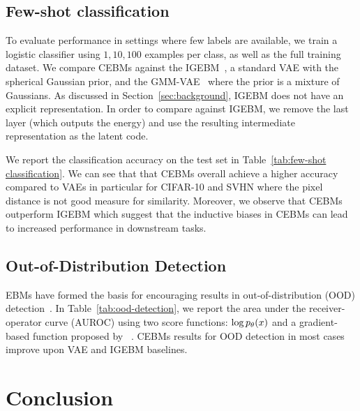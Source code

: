 \documentclass[tablecaption=bottom,wcp]{jmlr} %
\begin{document}
\vspace*{-1.0ex}
\subsection{Few-shot classification}\label{sec:exp:fewshots}
\vspace*{-1.0ex}

To evaluate performance in settings where few labels are available, we train a logistic classifier using $1, 10, 100$ examples per class, as well as the full training dataset. We compare CEBMs against the  IGEBM~\cite{du2019implicit}, a standard VAE  with the spherical Gaussian prior, and the GMM-VAE~\cite{tomczak2018vae} where the prior is a mixture of Gaussians. As discussed in Section~\ref{sec:background}, IGEBM does not have an explicit representation. In order to compare against IGEBM, we remove the last layer (which outputs the energy) and use the resulting intermediate representation as the latent code. 

We report the classification accuracy on the test set in Table~\ref{tab:few-shot classification}. We can see that that CEBMs overall achieve a higher accuracy compared to VAEs in particular for CIFAR-10 and SVHN where the pixel distance is not good measure for similarity. Moreover, we observe that CEBMs outperform IGEBM which suggest that the inductive biases in CEBMs can lead to increased performance in downstream tasks. 

\subsection{Out-of-Distribution Detection}
\label{sec:ood}
EBMs have formed the basis for encouraging results in out-of-distribution (OOD) detection~\cite{du2019implicit,grathwohl2019your}. In Table~\ref{tab:ood-detection}, we report the area under the receiver-operator curve (AUROC) using two score functions: $\log p_\theta(x)$ and a gradient-based function proposed by ~\citet{grathwohl2019your}. CEBMs results for OOD detection in most cases improve upon VAE and IGEBM baselines.

\vspace*{-0.5ex}
\section{Conclusion}
\label{sec:conclusion}
\vspace*{-0.5ex}
\end{document}
